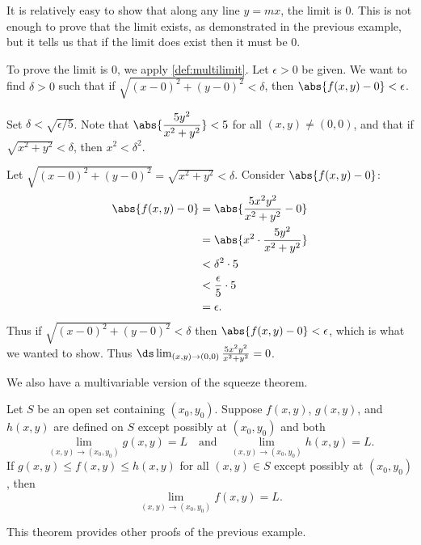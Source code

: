 {It is relatively easy to show that along any line $y=mx$, the limit is 0. This is not enough to prove that the limit exists, as demonstrated in the previous example, but it tells us that if the limit does exist then it must be 0.

To prove the limit is 0, we apply \autoref{def:multilimit}. Let $\epsilon >0$ be given. We want to find $\delta >0$ such that if $\sqrt{(x-0)^2+(y-0)^2} <\delta$, then $\abs{f(x,y)-0}<\epsilon$.

Set $\delta < \sqrt{\epsilon/5}$. Note that $\abs{\dfrac{5y^2}{x^2+y^2}}<5$ for all $(x,y)\neq (0,0)$, and that if $\sqrt{x^2+y^2} <\delta$, then $x^2<\delta^2$.

Let $\sqrt{(x-0)^2+(y-0)^2} = \sqrt{x^2+y^2}<\delta$. Consider $\abs{f(x,y)-0}$:
\begin{align*}
\abs{f(x,y)-0}&= \abs{\frac{5x^2y^2}{x^2+y^2}-0} \\
				&= \abs{x^2\cdot\frac{5y^2}{x^2+y^2}}\\
				&< \delta^2\cdot 5 \\
				&< \frac{\epsilon}{5}\cdot 5 \\
				&= \epsilon.
\end{align*}
Thus if $\sqrt{(x-0)^2+(y-0)^2}<\delta$ then $\abs{f(x,y)-0}<\epsilon$, which is what we wanted to show. Thus $\ds \lim_{(x,y)\to(0,0)} \frac{5x^2y^2}{x^2+y^2} = 0$.}

We also have a multivariable version of the squeeze theorem.

\begin{theorem}\label{thm:multi_squeeze}
Let $S$ be an open set containing $(x_0, y_0)$.  Suppose $f(x, y)$, $g(x, y)$, and $h(x, y)$ are defined on $S$ except possibly at $(x_0, y_0)$ and both
\[
\lim_{(x,y)\to(x_0, y_0)}g(x, y)=L
\quad\text{and}\quad
\lim_{(x,y)\to(x_0, y_0)} h(x, y) = L.
\]
If $g(x,y)\leq f(x, y)\leq h(x,y)$ for all $(x,y)\in S$ except possibly at $(x_0, y_0)$, then
\[\lim_{(x,y)\to(x_0, y_0)}f(x, y)=L.\]
\end{theorem}

This theorem provides other proofs of the previous example.


